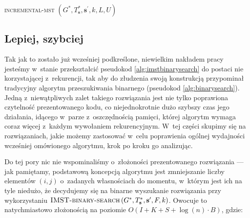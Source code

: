 \begin{pseudokod}
{{		}
	}
	\caption{\textsc{incremental-mst} $\left( G^{\ast}, T^{\ast}_{\textbf{s}}, \textbf{s}^{\prime}, k, L, U \right)$}
	\label{alg:imstbinarysearch}
\end{pseudokod}



\subsection{Lepiej, szybciej}



Tak jak to zostało już wcześniej podkreślone, niewielkim nakładem pracy jesteśmy w~stanie przekształcić pseudokod \ref{alg:imstbinarysearch} do postaci nie korzystającej z~rekurencji, tak aby do złudzenia swoją konstrukcją przypominał tradycyjny algorytm przeszukiwania binarnego (pseudokod \ref{alg:binarysearch}). Jedną z~niewątpliwych zalet takiego rozwiązania jest nie tylko poprawiona czytelność prezentowanego kodu, co niejednokrotnie dużo szybszy czas jego działania, idącego w~parze z~oszczędnością pamięci, której algorytm wymaga coraz więcej z~każdym wywołaniem rekurencyjnym. W~tej części skupimy się na rozwiązaniach, jakie możemy zastosować w~celu poprawienia ogólnej wydajności wcześniej omówionego algorytmu, krok po kroku go analizując.

Do tej pory nic nie wspominaliśmy o~złożoności prezentowanego rozwiązania --- jak pamiętamy, podstawową koncepcją algorytmu jest zmniejszanie liczby elementów $\left( i, j \right)$ o~zadanych własnościach do momentu, w~którym jest ich na tyle niedużo, że decydujemy się na binarne wyszukanie rozwiązania przy wykorzystaniu $\textsc{IMST-binary-search} \left( G^{\ast}, T^{\ast}_{\textbf{s}}, \textbf{s}^{\prime}, F, k \right)$. Owocuje to natychmiastowo złożonością na poziomie $O \left( I + K + S + \log \left( n \right) \cdot B \right)$, gdzie:

